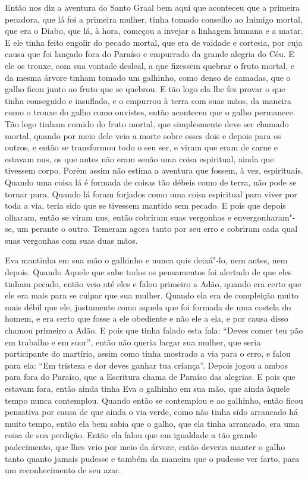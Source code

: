 Então nos diz a aventura do Santo Graal bem aqui que aconteceu que a primeira
pecadora, que lá foi a primeira mulher, tinha tomado conselho ao Inimigo
mortal, que era o Diabo, que lá, à hora, começou a invejar a linhagem humana e
a matar. E ele tinha feito engolir do pecado mortal, que era de vaidade e
cortesia, por cuja causa que foi lançado fora do Paraíso e empurrado da grande
alegria do Céu. E ele os trouxe, com sua vontade desleal, a que fizessem
quebrar o fruto mortal, e da mesma árvore tinham tomado um galhinho, como denso
de camadas, que o galho ficou junto ao fruto que se quebrou. E tão logo ela lhe
fez provar o que tinha conseguido e insuflado, e o empurrou à terra com suas
mãos, da maneira como o trouxe do galho como ouvistes, então aconteceu que o
galho permanece. Tão logo tinham comido do fruto mortal, que simplesmente deve
ser chamado mortal, quando por meio dele veio a morte sobre esses dois e depois
para os outros, e então se transformou todo o seu ser, e viram que eram de
carne e estavam nus, os que antes não eram senão uma coisa espiritual, ainda
que tivessem corpo. Porém assim não estima a aventura que fossem, à vez,
espirituais. Quando uma coisa lá é formada de coisas tão débeis como de terra, não
pode se tornar pura. Quando lá foram forjados como uma coisa espiritual para
viver por toda a via, teria sido que se tivessem mantido sem pecado. E pois que
depois olharam, então se viram nus, então cobriram suas vergonhas e
envergonharam"-se, um perante o outro. Temeram agora tanto por seu erro e
cobriram cada qual suas vergonhas com suas duas mãos.

Eva mantinha em sua mão o galhinho e nunca quis deixá"-lo, nem antes, nem depois.
Quando Aquele que sabe todos os pensamentos foi alertado de que eles tinham
pecado, então veio até eles e falou primeiro a Adão, quando era certo que ele
era mais para se culpar que sua mulher. Quando ela era de compleição muito mais
débil que ele, justamente como aquela que foi formada de uma costela do homem,
e era certo que fosse a ele obediente e não ele a ela, e por causa disso chamou
primeiro a Adão. E pois que tinha falado esta fala: “Deves comer teu pão em
trabalho e em suor”, então não queria largar sua mulher, que seria participante
do martírio, assim como tinha mostrado a via para o erro, e falou para ela: “Em
tristeza e dor deves ganhar tua criança”. Depois jogou a ambos para fora do
Paraíso, que a Escritura chama de Paraíso das alegrias. E pois que estavam
fora, então ainda tinha Eva o galhinho em sua mão, que ainda àquele tempo nunca
contemplou. Quando então se contemplou e ao galhinho, então ficou pensativa por
causa de que ainda o via verde, como não tinha sido arrancado há muito tempo,
então ela bem sabia que o galho, que ela tinha arrancado, era uma coisa de sua
perdição. Então ela falou que em igualdade a tão grande padecimento, que lhes
veio por meio da árvore, então deveria manter o galho tanto quanto jamais
pudesse e também da maneira que o pudesse ver farto, para um reconhecimento de
seu azar.

